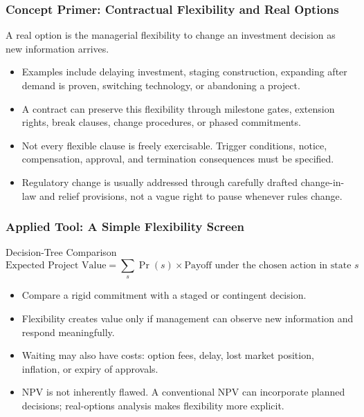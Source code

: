 \documentclass{beamer}
\begin{document}
\begin{frame}[t]
\frametitle{Concept Primer: Contractual Flexibility and Real Options}
A real option is the managerial flexibility to change an investment decision as new information arrives.
\begin{itemize}
\item Examples include delaying investment, staging construction, expanding after demand is proven, switching technology, or abandoning a project.
\item A contract can preserve this flexibility through milestone gates, extension rights, break clauses, change procedures, or phased commitments.
\item Not every flexible clause is freely exercisable. Trigger conditions, notice, compensation, approval, and termination consequences must be specified.
\item Regulatory change is usually addressed through carefully drafted change-in-law and relief provisions, not a vague right to pause whenever rules change.
\end{itemize}
\end{frame}

\begin{frame}[t]
\frametitle{Applied Tool: A Simple Flexibility Screen}
\begin{block}{Decision-Tree Comparison}
\[
\text{Expected Project Value}=\sum_s \Pr(s)\times\text{Payoff under the chosen action in state }s
\]
\end{block}
\begin{itemize}
\item Compare a rigid commitment with a staged or contingent decision.
\item Flexibility creates value only if management can observe new information and respond meaningfully.
\item Waiting may also have costs: option fees, delay, lost market position, inflation, or expiry of approvals.
\item NPV is not inherently flawed. A conventional NPV can incorporate planned decisions; real-options analysis makes flexibility more explicit.
\end{itemize}
\end{frame}
\end{document}
